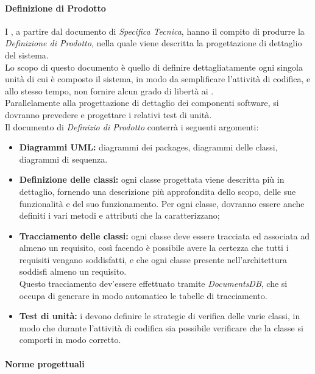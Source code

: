 	\paragraph{Definizione di Prodotto}
	I \textit{\Progs}, a partire dal documento di \textit{Specifica Tecnica}, hanno il compito di produrre la \textit{Definizione di Prodotto}, nella quale viene descritta la progettazione di dettaglio del sistema.\\
	Lo scopo di questo documento è quello di definire dettagliatamente ogni singola unità
	di cui è composto il sistema, in modo da semplificare l’attività di codifica, e allo stesso
	tempo, non fornire alcun grado di libertà ai \textit{\Progrs}.\\
	Parallelamente alla progettazione di dettaglio dei componenti software, si dovranno prevedere e progettare i relativi test di unità.\\
	Il documento di \textit{Definizio di Prodotto} conterrà i seguenti argomenti:
	\begin{itemize}
		\item \textbf{Diagrammi UML:} diagrammi dei packages, diagrammi delle classi, diagrammi di sequenza.
		\item \textbf{Definizione delle classi:} ogni classe progettata viene descritta più in dettaglio, fornendo una descrizione più approfondita dello scopo, delle sue funzionalità e del suo funzionamento. Per ogni classe, dovranno essere anche definiti i vari metodi e attributi che la caratterizzano;
		\item \textbf{Tracciamento delle classi:} ogni classe deve essere tracciata ed associata ad almeno un requisito, così facendo è possibile avere la certezza che tutti i requisiti vengano soddisfatti, e che ogni classe presente nell'architettura soddisfi almeno un requisito.\\
		Questo tracciamento dev'essere effettuato tramite \textit{DocumentsDB}, che si occupa di generare in modo automatico le tabelle di tracciamento.
		\item \textbf{Test di unità:} i \textit{\Progs} devono definire le strategie di verifica delle varie classi, in modo che durante l'attività di codifica sia possibile verificare che la classe si comporti in modo corretto.
	\end{itemize}
	
	\paragraph{Norme progettuali}
	
